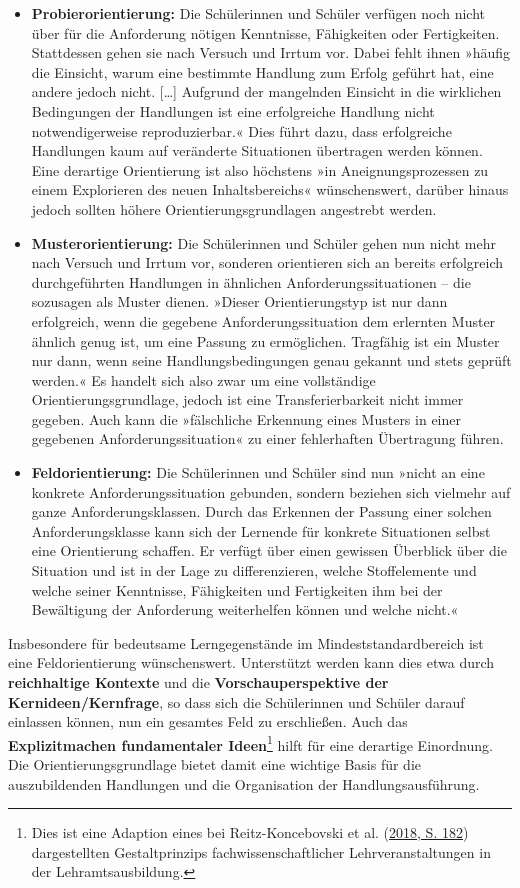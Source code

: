 \documentclass[
]{scrbook}
\theoremstyle{definition}
\theoremstyle{definition}
\theoremstyle{definition}
\theoremstyle{definition}
\theoremstyle{remark}
\begin{document}
\begin{itemize}
\item
  \textbf{Probierorientierung:} Die Schülerinnen und Schüler verfügen noch nicht über für die Anforderung nötigen Kenntnisse, Fähigkeiten oder Fertigkeiten. Stattdessen gehen sie nach Versuch und Irrtum vor. Dabei fehlt ihnen »häufig die Einsicht, warum eine bestimmte Handlung zum Erfolg geführt hat, eine andere jedoch nicht. {[}\ldots{]} Aufgrund der mangelnden Einsicht in die wirklichen Bedingungen der Handlungen ist eine erfolgreiche Handlung nicht notwendigerweise reproduzierbar.« Dies führt dazu, dass erfolgreiche Handlungen kaum auf veränderte Situationen übertragen werden können. Eine derartige Orientierung ist also höchstens »in Aneignungsprozessen zu einem Explorieren des neuen Inhaltsbereichs« wünschenswert, darüber hinaus jedoch sollten höhere Orientierungsgrundlagen angestrebt werden.
\item
  \textbf{Musterorientierung:} Die Schülerinnen und Schüler gehen nun nicht mehr nach Versuch und Irrtum vor, sonderen orientieren sich an bereits erfolgreich durchgeführten Handlungen in ähnlichen Anforderungssituationen -- die sozusagen als Muster dienen.
  »Dieser Orientierungstyp ist nur dann erfolgreich, wenn die gegebene Anforderungssituation dem erlernten Muster ähnlich genug ist, um eine Passung zu ermöglichen. Tragfähig ist ein Muster nur dann, wenn seine Handlungsbedingungen genau gekannt und stets geprüft werden.«
  Es handelt sich also zwar um eine vollständige Orientierungsgrundlage, jedoch ist eine Transferierbarkeit nicht immer gegeben. Auch kann die »fälschliche Erkennung eines Musters in einer gegebenen Anforderungssituation« zu einer fehlerhaften Übertragung führen.
\item
  \textbf{Feldorientierung:} Die Schülerinnen und Schüler sind nun »nicht an eine konkrete Anforderungssituation gebunden, sondern beziehen sich vielmehr auf ganze Anforderungsklassen. Durch das Erkennen der Passung einer solchen Anforderungsklasse kann sich der Lernende für konkrete Situationen selbst eine Orientierung schaffen. Er verfügt über einen gewissen Überblick über die Situation und ist in der Lage zu differenzieren, welche Stoffelemente und welche seiner Kenntnisse, Fähigkeiten und Fertigkeiten ihm bei der Bewältigung der Anforderung weiterhelfen können und welche nicht.«
\end{itemize}

Insbesondere für bedeutsame Lerngegenstände im Mindeststandardbereich ist eine Feldorientierung wünschenswert. Unterstützt werden kann dies etwa durch \textbf{reichhaltige Kontexte} und die \textbf{Vorschauperspektive der Kernideen/Kernfrage}, so dass sich die Schülerinnen und Schüler darauf einlassen können, nun ein gesamtes Feld zu erschließen. Auch das \textbf{Explizitmachen fundamentaler Ideen}\footnote{Dies ist eine Adaption eines bei Reitz-Koncebovski et al. (\protect\hyperlink{ref-Reitz-Koncebovski2018}{2018, S. 182}) dargestellten Gestaltprinzips fachwissenschaftlicher Lehrveranstaltungen in der Lehramtsausbildung.} hilft für eine derartige Einordnung. Die Orientierungsgrundlage bietet damit eine wichtige Basis für die auszubildenden Handlungen und die Organisation der Handlungsausführung.
\end{document}
